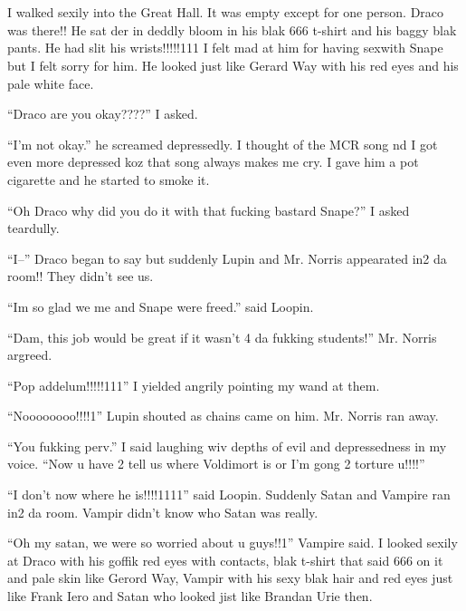 \section{}



I walked sexily into the Great Hall. It was empty except for one person. Draco was there!! He sat der in deddly bloom in his blak 666 t-shirt and his baggy blak pants. He had slit his wrists!!!!!111 I felt mad at him for having sexwith Snape but I felt sorry for him. He looked just like Gerard Way with his red eyes and his pale white face.

\enquote{Draco are you okay????} I asked.

\enquote{I'm not okay.} he screamed depressedly. I thought of the MCR song nd I got even more depressed koz that song always makes me cry. I gave him a pot cigarette and he started to smoke it.

\enquote{Oh Draco why did you do it with that fucking bastard Snape?} I asked teardully.

\enquote{I--} Draco began to say but suddenly Lupin and Mr. Norris appearated in2 da room!! They didn't see us.

\enquote{Im so glad we me and Snape were freed.} said Loopin.

\enquote{Dam, this job would be great if it wasn't 4 da fukking students!} Mr. Norris argreed.

\enquote{Pop addelum!!!!!111} I yielded angrily pointing my wand at them.

\enquote{Noooooooo!!!!1} Lupin shouted as chains came on him. Mr. Norris ran away.

\enquote{You fukking perv.} I said laughing wiv depths of evil and depressedness in my voice. \enquote{Now u have 2 tell us where Voldimort is or I'm gong 2 torture u!!!!}

\enquote{I don't now where he is!!!!1111} said Loopin. Suddenly Satan and Vampire ran in2 da room. Vampir didn't know who Satan was really.

\enquote{Oh my satan, we were so worried about u guys!!1} Vampire said. I looked sexily at Draco with his goffik red eyes with contacts, blak t-shirt that said 666 on it and pale skin like Gerord Way, Vampir with his sexy blak hair and red eyes just like Frank Iero and Satan who looked jist like Brandan Urie then.


